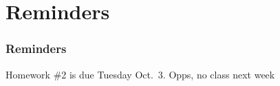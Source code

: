 \documentclass[11pt]{beamer}
\begin{document}
\section{Reminders}

\begin{frame}
  \frametitle{Reminders}
  \Enlarge

  \begin{itemize}
  \myitem Homework \#2 is due Tuesday Oct.\ 3. \pause
  \myitem Opps, no class next week
  \end{itemize}
\end{frame}
\end{document}
